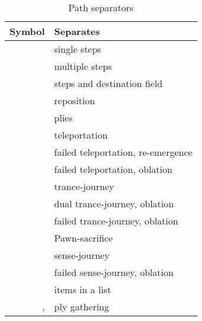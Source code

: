 \begin{table}[!h]
\centering
\begin{tabular}{ rl }
\toprule %
\textbf{Symbol}         & \textbf{Separates}                         \\
\midrule %
\alg{.}                 & single steps                               \\
\alg{..}                & multiple steps                             \\
\alg{-}                 & steps and destination field                \\
\alg{\textbackslash}    & reposition                                 \\
\cmidrule{1-2} %
\alg{\textasciitilde{}} & plies                                      \\
\alg{|}                 & teleportation                              \\
\alg{||}                & failed teleportation, re-emergence         \\
\alg{|||}               & failed teleportation, oblation             \\
\alg{@}                 & trance-journey                             \\
\alg{@@}                & dual trance-journey, oblation              \\
\alg{@@@}               & failed trance-journey, oblation            \\
\alg{;;}                & Pawn-sacrifice                             \\
\alg{"}                 & sense-journey                              \\
\alg{'}                 & failed sense-journey, oblation             \\
\cmidrule{1-2} %
\alg{,}                 & items in a list                            \\
\alg{[}, \alg{]}        & ply gathering                              \\
\bottomrule %
\end{tabular}
\caption{Path separators}
\label{tbl:Appendix/Summary/Path separators}
\end{table}

